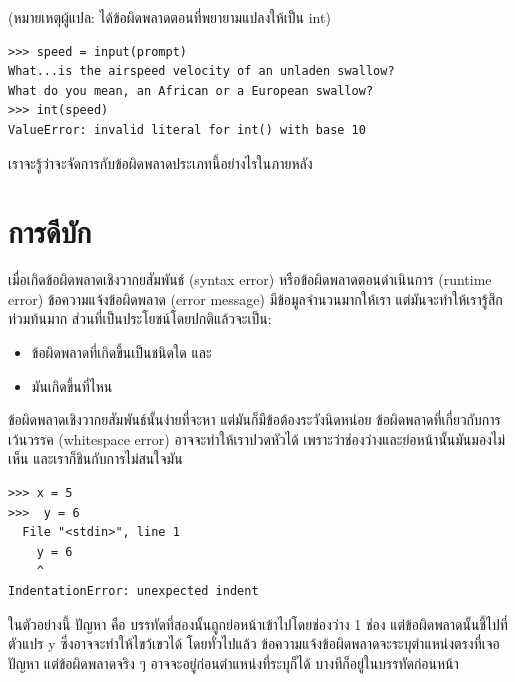 (หมายเหตุผู้แปล: ได้ข้อผิดพลาดตอนที่พยายามแปลงให้เป็น int)

\begin{verbatim}
>>> speed = input(prompt)
What...is the airspeed velocity of an unladen swallow?
What do you mean, an African or a European swallow?
>>> int(speed)
ValueError: invalid literal for int() with base 10
\end{verbatim}
%
เราจะรู้ว่าจะจัดการกับข้อผิดพลาดประเภทนี้อย่างไรในภายหลัง


\section{การดีบัก}
\label{whitespace}

เมื่อเกิดข้อผิดพลาดเชิงวากยสัมพันธ์ (syntax error) หรือข้อผิดพลาดตอนดำเนินการ (runtime error)
ข้อความแจ้งข้อผิดพลาด (error message) มีข้อมูลจำนวนมากให้เรา แต่มันจะทำให้เรารู้สึกท่วมท้นมาก 
ส่วนที่เป็นประโยชน์โดยปกติแล้วจะเป็น:

\begin{itemize}

\item ข้อผิดพลาดที่เกิดขึ้นเป็นชนิดใด และ

\item มันเกิดขึ้นที่ไหน

\end{itemize}

ข้อผิดพลาดเชิงวากยสัมพันธ์นั้นง่ายที่จะหา แต่มันก็มีข้อต้องระวังนิดหน่อย 
ข้อผิดพลาดที่เกี่ยวกับการเว้นวรรค (whitespace error) อาจจะทำให้เราปวดหัวได้ 
เพราะว่าช่องว่างและย่อหน้านั้นมันมองไม่เห็น และเราก็ชินกับการไม่สนใจมัน

\begin{verbatim}
>>> x = 5
>>>  y = 6
  File "<stdin>", line 1
    y = 6
    ^
IndentationError: unexpected indent
\end{verbatim}
%
ในตัวอย่างนี้ ปัญหา คือ บรรทัดที่สองนั้นถูกย่อหน้าเข้าไปโดยช่องว่าง 1 ช่อง
แต่ข้อผิดพลาดนั้นชี้ไปที่ตัวแปร y ซึ่งอาจจะทำให้ไขว้เขวได้
โดยทั่วไปแล้ว ข้อความแจ้งข้อผิดพลาดจะระบุตำแหน่งตรงที่เจอปัญหา แต่ข้อผิดพลาดจริง ๆ 
อาจจะอยู่ก่อนตำแหน่งที่ระบุก็ได้ บางทีก็อยู่ในบรรทัดก่อนหน้า 

